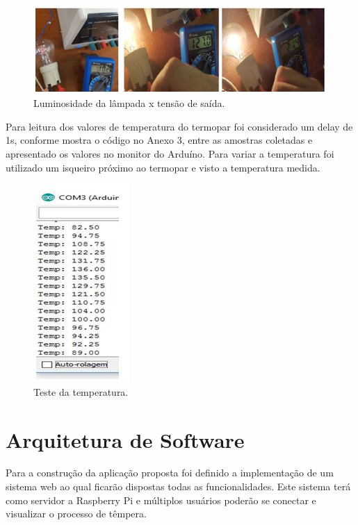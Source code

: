 \begin{figure}[H]
	\centering
	\label{luminosidade}
	\includegraphics[keepaspectratio=true,scale=1.0]{figuras/luminosidade.JPG}
	\caption{Luminosidade da lâmpada x tensão de saída.}
\end{figure}

Para leitura dos valores de temperatura do termopar foi considerado um delay de 1s, conforme mostra o código no Anexo 3, entre as amostras coletadas e apresentado os valores no monitor do Arduíno. Para variar a temperatura foi utilizado um isqueiro próximo ao termopar e visto a temperatura medida.

\begin{figure}[H]
	\centering
	\label{testetemperatura}
	\includegraphics[keepaspectratio=true,scale=1.0]{figuras/testetemperatura.JPG}
	\caption{Teste da temperatura.}
\end{figure}

\section{Arquitetura de Software}

Para a construção da aplicação proposta foi definido a implementação de um sistema web ao qual ficarão dispostas todas as funcionalidades. Este sistema terá como servidor a Raspberry Pi e múltiplos usuários poderão se conectar e visualizar o processo de têmpera.

